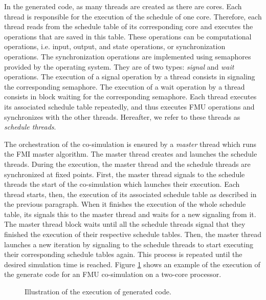 In the generated code, as many threads are created as there are cores. Each thread is responsible for the execution of the schedule of one core. Therefore, each thread reads from the schedule table of its corresponding core and executes the operations that are saved in this table. These operations can be computational operations, i.e. input, output, and state operations, or synchronization operations. The synchronization operations are implemented using semaphores provided by the operating system. They are of two types: \textit{signal} and \textit{wait} operations. The execution of a signal operation by a thread consists in signaling the corresponding semaphore. The execution of a wait operation by a thread consists in block waiting for the corresponding semaphore. Each thread executes its associated schedule table repeatedly, and thus executes FMU operations and synchronizes with the other threads. Hereafter, we refer to these threads as \textit{schedule threads}. 

The orchestration of the co-simulation is ensured by a \textit{master} thread which runs the FMI master algorithm. The master thread creates and launches the schedule threads. During the execution, the master thread and the schedule threads are synchronized at fixed points. First, the master thread signals to the schedule threads the start of the co-simulation which launches their execution. Each thread starts, then, the execution of its associated schedule table as described in the previous paragraph. When it finishes the execution of the whole schedule table, its signals this to the master thread and waits for a new signaling from it. The master thread block waits until all the schedule threads signal that they finished the execution of their respective schedule tables. Then, the master thread launches a new iteration by signaling to the schedule threads to start executing their corresponding schedule tables again. This process is repeated until the desired simulation time is reached. Figure \ref{fig:codegen} shows an example of the execution of the generate code for an FMU co-simulation on a two-core processor.

\begin{figure}[phbt]
\centering

\caption{Illustration of the execution of generated code.}
\label{fig:codegen}
\end{figure}   


